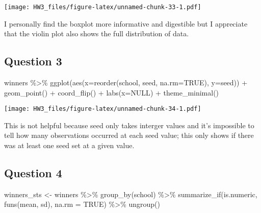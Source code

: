 \documentclass[
]{article}
\newenvironment{Shaded}{\begin{snugshade}}{\end{snugshade}}
\newcommand{\AttributeTok}[1]{\textcolor[rgb]{0.77,0.63,0.00}{#1}}
\newcommand{\ConstantTok}[1]{\textcolor[rgb]{0.00,0.00,0.00}{#1}}
\newcommand{\FunctionTok}[1]{\textcolor[rgb]{0.00,0.00,0.00}{#1}}
\newcommand{\NormalTok}[1]{#1}
\newcommand{\OtherTok}[1]{\textcolor[rgb]{0.56,0.35,0.01}{#1}}
\newcommand{\SpecialCharTok}[1]{\textcolor[rgb]{0.00,0.00,0.00}{#1}}
\begin{document}
\texttt{[image: HW3\_files/figure-latex/unnamed-chunk-33-1.pdf]}

I personally find the boxplot more informative and digestible but I
appreciate that the violin plot also shows the full distribution of
data.

\hypertarget{question-3-2}{%
\subsection{Question 3}\label{question-3-2}}

\begin{Shaded}
\begin{Highlighting}[]
\NormalTok{winners }\SpecialCharTok{\%\textgreater{}\%} \FunctionTok{ggplot}\NormalTok{(}\FunctionTok{aes}\NormalTok{(}\AttributeTok{x=}\FunctionTok{reorder}\NormalTok{(school, seed, }\AttributeTok{na.rm=}\ConstantTok{TRUE}\NormalTok{),}
                       \AttributeTok{y=}\NormalTok{seed)) }\SpecialCharTok{+}
  \FunctionTok{geom\_point}\NormalTok{() }\SpecialCharTok{+}
  \FunctionTok{coord\_flip}\NormalTok{() }\SpecialCharTok{+} 
  \FunctionTok{labs}\NormalTok{(}\AttributeTok{x=}\ConstantTok{NULL}\NormalTok{) }\SpecialCharTok{+}
  \FunctionTok{theme\_minimal}\NormalTok{()}
\end{Highlighting}
\end{Shaded}

\texttt{[image: HW3\_files/figure-latex/unnamed-chunk-34-1.pdf]}

This is not helpful because seed only takes interger values and it's
impossible to tell how many observations occurred at each seed value;
this only shows if there was at least one seed set at a given value.

\hypertarget{question-4-2}{%
\subsection{Question 4}\label{question-4-2}}

\begin{Shaded}
\begin{Highlighting}[]
\NormalTok{winners\_sts }\OtherTok{\textless{}{-}}\NormalTok{ winners }\SpecialCharTok{\%\textgreater{}\%} \FunctionTok{group\_by}\NormalTok{(school) }\SpecialCharTok{\%\textgreater{}\%} 
  \FunctionTok{summarize\_if}\NormalTok{(is.numeric, }\FunctionTok{funs}\NormalTok{(mean, sd), }\AttributeTok{na.rm =} \ConstantTok{TRUE}\NormalTok{) }\SpecialCharTok{\%\textgreater{}\%}
  \FunctionTok{ungroup}\NormalTok{()}
\end{Highlighting}
\end{Shaded}
\end{document}

